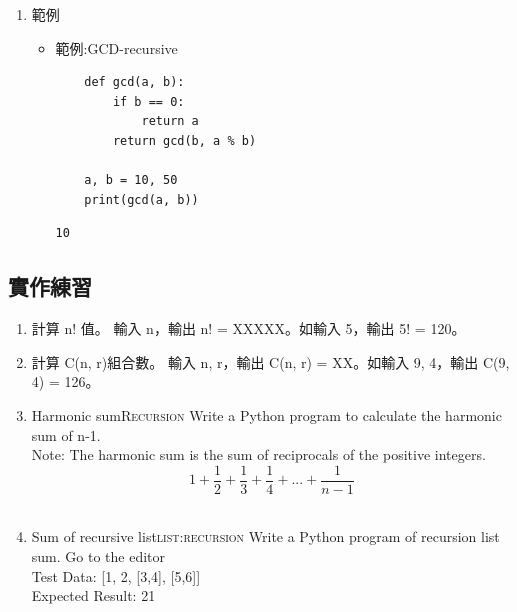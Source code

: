 \documentclass[a4paper,12pt]{article}
\begin{document}
\begin{enumerate}
\begin{itemize}
\begin{verbatim}
10
\end{verbatim}
\end{itemize}

\item 範例
\label{sec:org0d33433}
\begin{itemize}
\item 範例:GCD-recursive\\
\lstset{breaklines=true,language=Python,label= ,caption= ,captionpos=b,firstnumber=1,numbers=left}
\begin{lstlisting}
    def gcd(a, b):
        if b == 0:
            return a
        return gcd(b, a % b)
  
    a, b = 10, 50
    print(gcd(a, b))
\end{lstlisting}

\begin{verbatim}
10
\end{verbatim}
\end{itemize}
\end{enumerate}


\subsection{實作練習}
\label{sec:org35ab693}
\begin{enumerate}
\item 計算 n! 值。 輸入 n，輸出 n! = XXXXX。如輸入 5，輸出 5! = 120。
\label{sec:org4355e70}
\item 計算 C(n, r)組合數。 輸入 n, r，輸出 C(n, r) = XX。如輸入 9, 4，輸出 C(9, 4) = 126。
\label{sec:org9d05796}
\item Harmonic sum\hfill{}\textsc{Recursion}
\label{sec:org25b45f0}
Write a Python program to calculate the harmonic sum of n-1.\\
Note: The harmonic sum is the sum of reciprocals of the positive integers.\\
$$ 1 + \frac{1}{2} + \frac{1}{3} + \frac{1}{4} + ... +  \frac{1}{n-1}    $$\\
\item Sum of recursive list\hfill{}\textsc{list:recursion}
\label{sec:org502e26e}
Write a Python program of recursion list sum. Go to the editor\\
Test Data: [1, 2, [3,4], [5,6]]\\
Expected Result: 21\\
\end{enumerate}
\end{document}
